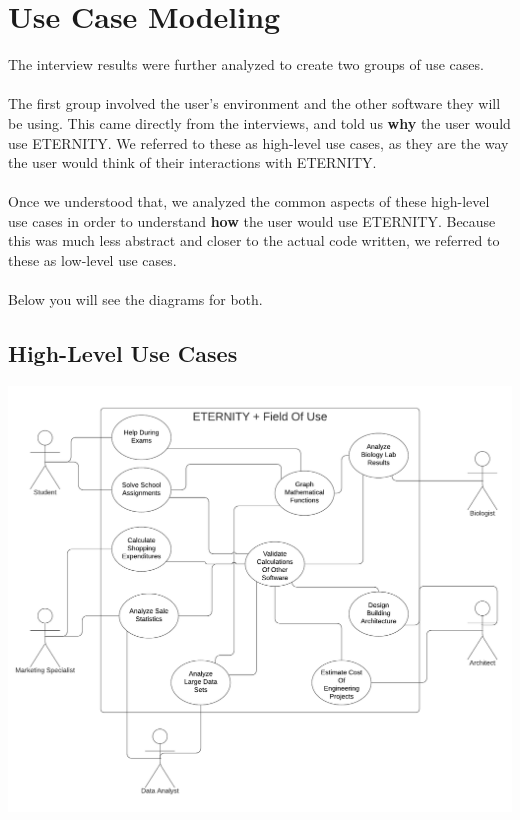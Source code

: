 \documentclass[11pt,onside]{report}
\begin{document}
\section{Use Case Modeling}
\begin{description}
The interview results were further analyzed to create two groups of use cases. \\ \\

The first group involved the user's environment and the other software they will be using. This came directly from the interviews, and told us \textbf{why} the user would use ETERNITY. We referred to these as high-level use cases, as they are the way the user would think of their interactions with ETERNITY. \\ \\

Once we understood that, we analyzed the common aspects of these high-level use cases in order to understand \textbf{how} the user would use ETERNITY. Because this was much less abstract and closer to the actual code written, we referred to these as low-level use cases. \\ \\

Below you will see the diagrams for both.
\end{description}

\subsection{High-Level Use Cases}
\begin{center}
    \includegraphics[scale=0.66]{images/high-level-use-case.png}
\end{center}
\end{document}
